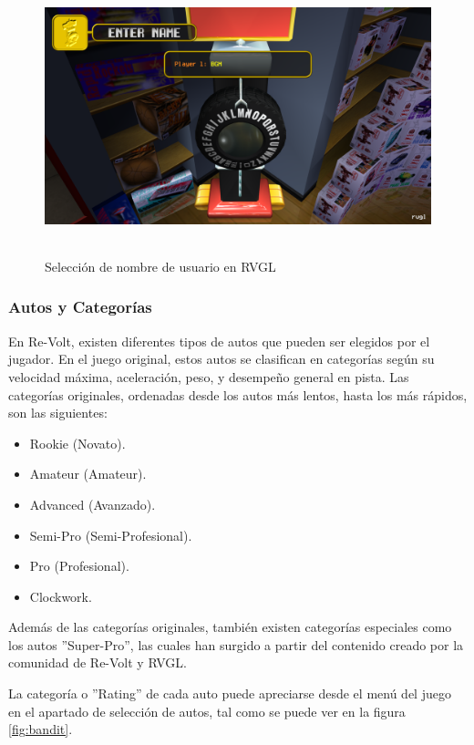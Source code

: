 \begin{figure}[H]
  \begin{center}
    \includegraphics[width=15cm, height=8cm]{img/username.png}
  \end{center}
  \caption[Selección de nombre de usuario en RVGL]{Selección de nombre de usuario en RVGL}
  \label{fig:username}
\end{figure}

\subsubsection{Autos y Categorías}
En Re-Volt, existen diferentes tipos de autos que pueden ser elegidos por el jugador. En el juego original, estos autos se clasifican en categorías según su velocidad máxima, aceleración, peso, y desempeño general en pista. Las categorías originales, ordenadas desde los autos más lentos, hasta los más rápidos, son las siguientes:

\begin{itemize}
	\item Rookie (Novato).
	\item Amateur (Amateur).
	\item Advanced (Avanzado).
	\item Semi-Pro (Semi-Profesional).
	\item Pro (Profesional).
  \item Clockwork.
\end{itemize}

Además de las categorías originales, también existen categorías especiales como los autos ''Super-Pro'', las cuales han surgido a partir del contenido creado por la comunidad de Re-Volt y RVGL.

La categoría o ''Rating'' de cada auto puede apreciarse desde el menú del juego en el apartado de selección de autos, tal como se puede ver en la figura \autoref{fig:bandit}.

